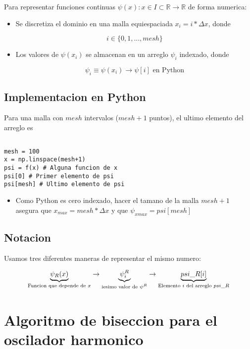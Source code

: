 \documentclass[11pt]{article}
\begin{document}
Para representar funciones continuas \(\psi(x) : x\in I \subset \mathbb{R} \to \mathbb{R}\) de forma numerica:

\begin{itemize}
\item Se discretiza el dominio en una malla equiespaciada \(x_i = i*\Delta x\), donde

\[ i \in \{0,1,...,mesh\} \]

\item Los valores de \(\psi(x_i)\) se almacenan en un arreglo \(\psi_i\) indexado, donde

\[ \psi_i \equiv \psi(x_i) \to \psi[i] \text{ en Python} \]
\end{itemize}
\subsection{Implementacion en Python}
\label{sec:org37bd776}

Para una malla con \(mesh\) intervalos (\(mesh + 1\) puntos), el ultimo elemento del arreglo es

\begin{verbatim}

mesh = 100
x = np.linspace(mesh+1)
psi = f(x) # Alguna funcion de x
psi[0] # Primer elemento de psi
psi[mesh] # Ultimo elemento de psi

\end{verbatim}

\begin{itemize}
\item Como Python es cero indexado, hacer el tamano de la malla \(mesh + 1\) asegura que \(x_{max} = mesh * \Delta x\) y que \(\psi_{xmax} = psi[mesh]\)
\end{itemize}
\subsection{Notacion}
\label{sec:org485ef93}

Usamos tres diferentes maneras de representar el mismo numero:

\[ \underbrace{\psi_R(x)}_{\text{Funcion que depende de \( x \)}} \to \underbrace{\psi_i^R}_{\text{iesimo valor de \( \psi^R \)}} \to \underbrace{psi\_R[i]}_{\text{Elemento \( i \) del arreglo \( psi\_R \)}} \]
\section{Algoritmo de biseccion para el oscilador harmonico}
\label{sec:org27107f9}
\end{document}
